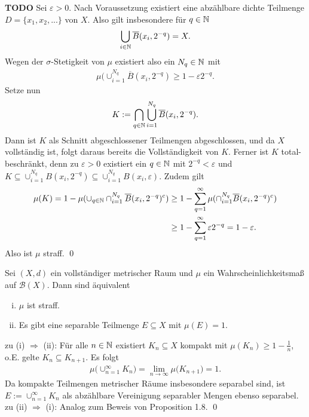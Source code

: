 \begin{proof*}
    \textbf{TODO}
    Sei $\varepsilon > 0$. Nach Voraussetzung existiert eine abzählbare dichte Teilmenge $D = \{x_1, x_2,...\}$ von $X$. Also gilt insbesondere für $q \in \mathbb{N} $
    \begin{align*}
        \bigcup_{i\in \mathbb{N}}\overline{B}(x_i, 2^{-q}) = X.
    \end{align*}
    Wegen der $\sigma$-Stetigkeit von $\mu$ existiert also ein $N_q \in \mathbb{N}$ mit 
    \begin{align*}
        \mu(\cup_{i=1}^{N_q}\overline{B}(x_i, 2^{-q}) \geq 1 - \varepsilon 2^{-q}. 
    \end{align*}
    Setze nun 
    \begin{align*}
        K := \bigcap_{q \in \mathbb{N}}\bigcup_{i=1}^{N_q}\overline{B}(x_i, 2^{-q}). 
    \end{align*}
    Dann ist $K$ als Schnitt abgeschlossener Teilmengen abgeschlossen, und da $X$ vollständig ist, folgt daraus bereits die Vollständigkeit von $K$. 
    Ferner ist $K$ total-beschränkt, denn zu $\varepsilon > 0$ existiert ein $q \in \mathbb{N}$ mit $2^{-q} < \varepsilon$ und $K \subseteq \cup_{i=1}^{N_q}B(x_i, 2^{-q}) \subseteq \cup_{i=1}^{N_q}B(x_i, \varepsilon)$. 
    Zudem gilt
    \begin{align*}
        \mu(K)  = 1 - \mu(\cup_{q \in \mathbb{N}}\cap_{i=1}^{N_q}\overline{B}(x_i, 2^{-q})^c) 
                &\geq 1 - \sum_{q=1}^{\infty} \mu(\cap_{i=1}^{N_q}\overline{B}(x_i, 2^{-q})^c) \\\
                &\geq 1 - \sum_{q=1}^{\infty} \varepsilon 2^{-q} = 1 - \varepsilon.
    \end{align*}
    Also ist $\mu$ straff. \qed
\end{proof*}

\begin{proposition}
    Sei $(X,d)$ ein vollständiger metrischer Raum und $\mu$ ein Wahrscheinlichkeitsmaß auf $\mathcal{B}(X)$. Dann sind äquivalent
    \begin{enumerate}[(i)]
        \item $\mu$ ist straff.
        \item Es gibt eine separable Teilmenge $E \subseteq X$ mit $\mu(E) = 1$. 
    \end{enumerate}
\end{proposition}
\begin{proof*}
    zu (i) $\Rightarrow$ (ii): Für alle $n \in \mathbb{N}$ existiert $K_n \subseteq X$ kompakt mit $\mu(K_n) \geq 1 - \frac{1}{n}$, o.E. gelte $K_n \subseteq K_{n+1}$. Es folgt 
    \begin{align*}
        \mu\big(\cup_{n=1}^{\infty}K_n\big) = \lim_{n \to \infty}\mu\big(K_{n+1}\big) = 1. 
    \end{align*}
    Da kompakte Teilmengen metrischer Räume insbesondere separabel sind, ist $E := \cup_{n=1}^{\infty}K_n$ als abzählbare Vereinigung separabler Mengen ebenso separabel. 
    \newline 
    zu (ii) $\Rightarrow$ (i): 
    Analog zum Beweis von Proposition 1.8. \qed
\end{proof*}
